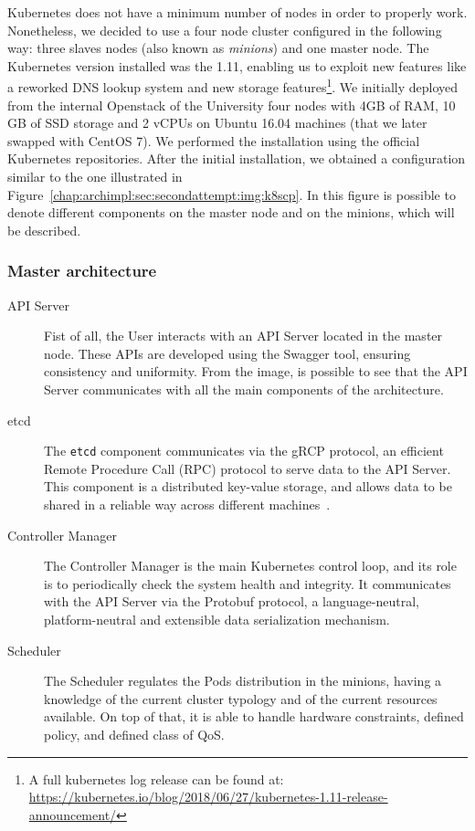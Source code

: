 Kubernetes does not have a minimum number of nodes in order to properly work.
Nonetheless, we decided to use a four node cluster configured in the following
way: three slaves nodes (also known as \emph{minions}) and one master node. The
Kubernetes version installed was the 1.11, enabling us to exploit new features
like a reworked DNS lookup system and new storage features\footnote{A full
  kubernetes log release can be found at:
  \url{https://kubernetes.io/blog/2018/06/27/kubernetes-1.11-release-announcement/}}.
We initially deployed from the internal Openstack of the University four nodes
with 4GB of RAM, 10 GB of SSD storage and 2 vCPUs on Ubuntu 16.04 machines (that
we later swapped with CentOS 7). We performed the installation using the
official Kubernetes repositories. After the initial installation, we obtained a
configuration similar to the one illustrated in
Figure~\ref{chap:archimpl:sec:secondattempt:img:k8scp}. In this figure is
possible to denote different components on the master node and on the minions,
which will be described.

\subsubsection{Master architecture}
\begin{description}
\item[API Server] Fist of all, the User interacts with an API Server located in
  the master node. These APIs are developed using the Swagger tool, ensuring
  consistency and uniformity. From the image, is possible to see that the API
  Server communicates with all the main components of the architecture.
\item[etcd] The \verb!etcd! component communicates via the gRCP protocol, an
  efficient Remote Procedure Call (RPC) protocol to serve data to the API
  Server. This component is a distributed key-value storage, and allows data to
  be shared in a reliable way across different machines~\cite{etcddatamodel}.
\item[Controller Manager] The Controller Manager is the main Kubernetes control
  loop, and its role is to periodically check the system health and integrity.
  It communicates with the API Server via the Protobuf protocol, a
  language-neutral, platform-neutral and extensible data serialization
  mechanism.
\item[Scheduler] The Scheduler regulates the Pods distribution in the minions,
  having a knowledge of the current cluster typology and of the current
  resources available. On top of that, it is able to handle hardware
  constraints, defined policy, and defined class of QoS.
\end{description}

